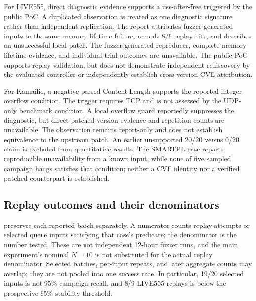 For LIVE555, direct diagnostic evidence supports a use-after-free triggered by the public PoC. A duplicated observation is treated as one diagnostic signature rather than independent replication. The report attributes fuzzer-generated inputs to the same memory-lifetime failure, records 8/9 replay hits, and describes an unsuccessful local patch. The fuzzer-generated reproducer, complete memory-lifetime evidence, and individual trial outcomes are unavailable. The public PoC supports replay validation, but does not demonstrate independent rediscovery by the evaluated controller or independently establish cross-version CVE attribution.

For Kamailio, a negative parsed Content-Length supports the reported integer-overflow condition. The trigger requires TCP and is not assessed by the UDP-only benchmark condition. A local overflow guard reportedly suppresses the diagnostic, but direct patched-version evidence and repetition counts are unavailable. The observation remains report-only and does not establish equivalence to the upstream patch. An earlier unsupported 20/20 versus 0/20 claim is excluded from quantitative results. The SMARTPL case reports reproducible unavailability from a known input, while none of five sampled campaign hangs satisfies that condition; neither a CVE identity nor a verified patched counterpart is established.

\subsection{Replay outcomes and their denominators}
 preserves each reported batch separately. A numerator counts replay attempts or selected queue inputs satisfying that case's predicate; the denominator is the number tested. These are not independent 12-hour fuzzer runs, and the main experiment's nominal $N=10$ is not substituted for the actual replay denominator. Selected batches, per-input repeats, and later aggregate counts may overlap; they are not pooled into one success rate. In particular, 19/20 selected inputs is not 95\% campaign recall, and 8/9 LIVE555 replays is below the prospective 95\% stability threshold.


